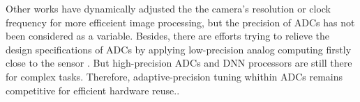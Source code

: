 Other works have dynamically adjusted the the camera’s resolution\cite{lubana_digital_2018} or clock frequency\cite{likamwa_energy_2013} for more efficeient image processing, but the precision of ADCs has not been considered as a variable. Besides, there are efforts trying to relieve the design specifications of ADCs by applying low-precision analog computing firstly close to the sensor \cite{likamwa_redeye_2016,chen_asp_2016,liu_ns-cim_2020}. 
But high-precision ADCs and DNN processors are still there for complex tasks. Therefore, adaptive-precision tuning whithin ADCs remains competitive for efficient hardware reuse..
 
